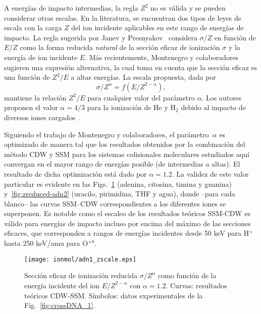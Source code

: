 A energías de impacto intermedias, la regla $Z^2$ no es válida y se 
pueden considerar otras escalas. En la literatura, se encuentran dos 
tipos de leyes de escala con la carga $Z$ del ion incidente aplicables 
en este rango de energías de impacto. La regla sugerida por Janev y 
Presnyakov~\cite{Janev:80} considera $\sigma/Z$ en función de $E/Z$ como 
la forma reducida \textit{natural} de la sección eficaz de ionización 
$\sigma$ y la energía de ion incidente $E$. Más recientemente, 
Montenegro y colaboradores~\cite{Dubois:13,Montenegro:13} sugieren una 
expresión alternativa, la cual toma en cuenta que la sección eficaz es 
una función de $Z^2/E$ a altas energías. La escala propuesta, dada por
\begin{equation}
 \sigma/Z^{\alpha}=f(E/Z^{2-\alpha}),
\label{eq:Montenegro}
\end{equation}
mantiene la relación $Z^2/E$ para cualquier valor del parámetro 
$\alpha$. Los autores proponen el valor $\alpha=4/3$ para la ionización 
de He y H$_2$ debido al impacto de diversos iones 
cargados~\cite{Dubois:13}. 

Siguiendo el trabajo de Montenegro y colaboradores, el 
parámetro~$\alpha$ es optimizado de manera tal que los resultados 
obtenidos por la combinación del método CDW y SSM para los sistemas 
colisionales moleculares estudiados aquí convergan en el mayor rango de 
energías posible (de intermedias a altas). El resultado de dicha 
optimización está dado por $\alpha=1.2$. La validez de este valor 
particular es evidente en las Figs.~\ref{fig:zreduced-adn1} (adenina, 
citosina, timina y guanina) y~\ref{fig:zreduced-adn2} (uracilo, 
pirimidina, THF y agua), donde --para cada blanco-- las curvas SSM--CDW 
correspondientes a los diferentes iones se superponen. Es notable como 
el escaleo de los resultados teóricos SSM-CDW es válido para energías de 
impacto incluso por encima del máximo de las secciones eficaces, que 
corresponden a rangos de energías incidentes desde 50 keV para H$^+$ 
hasta 250 keV/amu para O$^{+8}$.

\begin{figure}
\centering
\texttt{[image: ionmol/adn1\_zscale.eps]}
\caption[Sección eficaz de ionización reducida por $Z$ y $\alpha$ 
(Parte I).]
{Sección eficaz de ionización reducida $\sigma/Z^{\alpha}$ como función
de la energía incidente del ion $E/Z^{2-\alpha}$ con $\alpha=1.2$. 
Curvas: resultados teóricos CDW-SSM. 
Símbolos: datos experimentales de la Fig.~\ref{fig:crossDNA_1}.}
\label{fig:zreduced-adn1}
\end{figure} 

